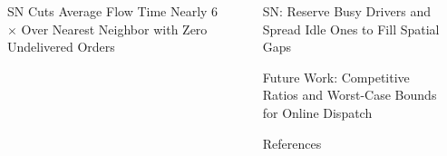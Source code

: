 \documentclass[final]{beamer}
\newlength{\sepwidth}
\newlength{\colwidth}
\newcommand{\separatorcolumn}{\begin{column}{\sepwidth}\end{column}}
\begin{document}
\begin{frame}[t]
\begin{columns}[t]
\begin{column}{\colwidth}
\begin{block}{SN Cuts Average Flow Time Nearly 6$\times$ Over Nearest Neighbor with Zero Undelivered Orders}
  \end{block}

\end{column}

\separatorcolumn

\begin{column}{\colwidth}

  \begin{exampleblock}{SN: Reserve Busy Drivers and Spread Idle Ones to Fill Spatial Gaps}

  \end{exampleblock}

  \begin{block}{Future Work: Competitive Ratios and Worst-Case Bounds for Online Dispatch}

  \end{block}

  \begin{block}{References}

    \nocite{*}
    \footnotesize{}

  \end{block}

\end{column}

\separatorcolumn
\end{columns}
\end{frame}
\end{document}
